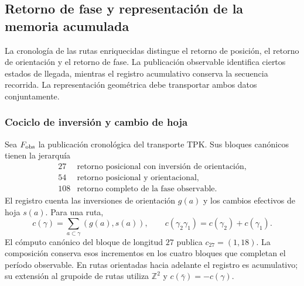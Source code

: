 
\subsection{Retorno de fase y representación de la memoria acumulada}
\label{ii:vii:sec:retorno-memoria-gravedad}

La cronología de las rutas enriquecidas distingue el retorno de posición,
el retorno de orientación y el retorno de fase. La publicación observable
identifica ciertos estados de llegada, mientras el registro acumulativo
conserva la secuencia recorrida. La representación geométrica debe
transportar ambos datos conjuntamente.

\subsubsection{Cociclo de inversión y cambio de hoja}
\label{ii:vii:subsec:cociclo-memoria}

Sea \(F_{\rm obs}\) la publicación cronológica del transporte TPK.
Sus bloques canónicos tienen la jerarquía
\[
\begin{array}{c|l}
27&\text{retorno posicional con inversión de orientación},\\
54&\text{retorno posicional y orientacional},\\
108&\text{retorno completo de la fase observable}.
\end{array}
\]
El registro cuenta las inversiones de orientación \(g(a)\) y los
cambios efectivos de hoja \(s(a)\). Para una ruta,
\begin{equation}
 c(\gamma)=\sum_{a\subset\gamma}(g(a),s(a)),\qquad
 c(\gamma_2\gamma_1)=c(\gamma_2)+c(\gamma_1).
 \label{ii:vii:eq:cociclo-ruta}
\end{equation}
El cómputo canónico del bloque de longitud \(27\) publica
\(c_{27}=(1,18)\). La composición conserva esos incrementos en
los cuatro bloques que completan el período observable.
En rutas orientadas hacia adelante el registro es acumulativo;
su extensión al grupoide de rutas utiliza \(\mathbb Z^2\) y
\(c(\bar\gamma)=-c(\gamma)\).

